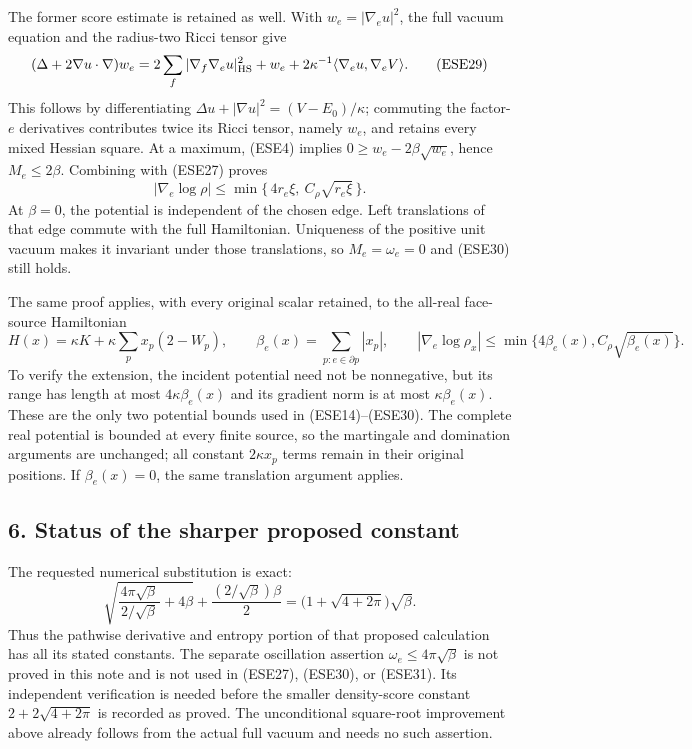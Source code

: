 \documentclass[11pt]{article}
\begin{document}
The former score estimate is retained as well. With \(w_e=|\nabla_eu|^2\), the full vacuum equation and the radius-two Ricci tensor give
\[
 (\Delta+2\nabla u\cdot\nabla)w_e
   =2\sum_f|\nabla_f\nabla_eu|_{\rm HS}^2+w_e
                   +2\kappa^{-1}\langle\nabla_eu,\nabla_eV\rangle.
 \tag{ESE29}
\]
This follows by differentiating
\(\Delta u+|\nabla u|^2=(V-E_0)/\kappa\); commuting the factor-\(e\) derivatives contributes twice its Ricci tensor, namely \(w_e\), and retains every mixed Hessian square. At a maximum, (ESE4) implies \(0\ge w_e-2\beta\sqrt{w_e}\), hence \(M_e\le2\beta\). Combining with (ESE27) proves
\[
 \boxed{\displaystyle
 |\nabla_e\log\rho|
    \le \min\{\,4r_e\xi,\ C_\rho\sqrt{r_e\xi}\,\}.}
 \tag{ESE30}
\]
At \(\beta=0\), the potential is independent of the chosen edge. Left translations of that edge commute with the full Hamiltonian. Uniqueness of the positive unit vacuum makes it invariant under those translations, so \(M_e=\omega_e=0\) and (ESE30) still holds.

The same proof applies, with every original scalar retained, to the all-real face-source Hamiltonian
\[
 H(x)=\kappa K+\kappa\sum_px_p(2-W_p),\qquad
 \beta_e(x)=\sum_{p:e\in\partial p}|x_p|,\qquad
 |\nabla_e\log\rho_x|
       \le\min\{4\beta_e(x),C_\rho\sqrt{\beta_e(x)}\}.
 \tag{ESE31}
\]
To verify the extension, the incident potential need not be nonnegative, but its range has length at most \(4\kappa\beta_e(x)\) and its gradient norm is at most \(\kappa\beta_e(x)\). These are the only two potential bounds used in (ESE14)–(ESE30). The complete real potential is bounded at every finite source, so the martingale and domination arguments are unchanged; all constant \(2\kappa x_p\) terms remain in their original positions. If \(\beta_e(x)=0\), the same translation argument applies.

\subsection*{6. Status of the sharper proposed constant}

The requested numerical substitution is exact:
\[
 \sqrt{\frac{4\pi\sqrt{\beta}}{\,2/\sqrt{\beta}\,}+4\beta}
       +\frac{(2/\sqrt{\beta})\beta}{2}
       =\bigl(1+\sqrt{4+2\pi}\bigr)\sqrt{\beta}.
 \tag{ESE32}
\]
Thus the pathwise derivative and entropy portion of that proposed calculation has all its stated constants. The separate oscillation assertion
\(\omega_e\le4\pi\sqrt{\beta}\) is not proved in this note and is not used in (ESE27), (ESE30), or (ESE31). Its independent verification is needed before the smaller density-score constant \(2+2\sqrt{4+2\pi}\) is recorded as proved. The unconditional square-root improvement above already follows from the actual full vacuum and needs no such assertion.
\end{document}
